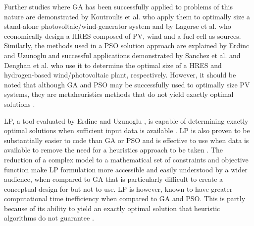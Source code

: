 \documentclass[a4paper,11pt,fleqn]{report}
\begin{document}
Further studies where \ac{GA} has been successfully applied to problems of this nature are demonstrated by Koutroulis et al. \citep{koutroulis2006} who apply them to optimally size a stand-alone photovoltaic/wind-generator system and by Lagorse et al.\citep{lagorse2009} who economically design a \ac{HRES} composed of \ac{PV}, wind and a fuel cell as sources. Similarly, the methods used in a \ac{PSO} solution approach are explained by Erdinc and Uzunoglu \citep{erdinc2012} and successful applications demonstrated by Sanchez et al. \citep{sanchez2010} and Denghan et al. \citep{dehghan2009} who use it to determine the optimal size of a \ac{HRES} and hydrogen-based wind/photovoltaic plant, respectively. However, it should be noted that although \ac{GA} and \ac{PSO} may be successfully used to optimally size \ac{PV} systems, they are metaheuristics methods that do not yield exactly optimal solutions \citep{Winston02}.

\ac{LP}, a tool evaluated by Erdinc and Uzunoglu \citep{erdinc2012}, is capable of determining exactly optimal solutions when sufficient input data is available \citep{Winston02}. \ac{LP} is also proven to be substantially easier to code than \ac{GA} or \ac{PSO} and is effective to use when data is available to remove the need for a heuristics approach to be taken \citep{erdinc2012}. The reduction of a complex model to a mathematical set of constraints and objective function make \ac{LP} formulation more accessible and easily understood by a wider audience, when compared to \ac{GA} that is particularly difficult to create a conceptual design for but not to use. \ac{LP} is however, known to have greater computational time inefficiency when compared to \ac{GA} and \ac{PSO}. This is partly because of its ability to yield an exactly optimal solution that heuristic algorithms do not guarantee \citep{Winston02}. 
\end{document}
